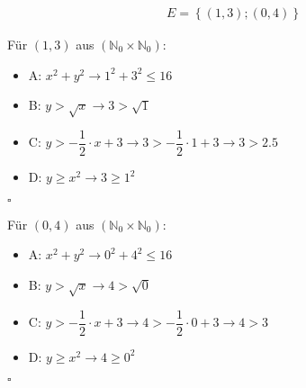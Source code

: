 \begin{eqnarray}
	E= \left\{ (1,3); (0,4) \right\} 
\end{eqnarray}

\clearpage

Für $(1,3)$ aus $\left(\mathbb{N}_0 \times \mathbb{N}_0\right)$:
\begin{itemize}
	\item A: $ x^2 +y^2 \rightarrow 1^2 + 3^2 \le 16$
	\item B: $ y > \sqrt{x} \rightarrow 3 > \sqrt{1}$
	\item C: $y > -\dfrac{1}{2}\cdot x+3 \rightarrow 3 > -\dfrac{1}{2} \cdot 1 +3 \rightarrow 3 > 2.5$
	\item D: $y \ge x^2 \rightarrow 3 \ge 1^2$
\end{itemize}
$\square$

\vspace{2cm}
Für $(0,4)$ aus $\left(\mathbb{N}_0 \times \mathbb{N}_0\right)$:
\begin{itemize}
	\item 
	A: $ x^2 +y^2 \rightarrow 0^2 + 4^2 \le 16$
	\item 
	B: $ y > \sqrt{x} \rightarrow 4 > \sqrt{0}$
	\item 
	C: $y > -\dfrac{1}{2}\cdot x+3 \rightarrow 4 > -\dfrac{1}{2} \cdot 0 +3 \rightarrow 4 > 3$
	\item
	D: $y \ge x^2 \rightarrow 4 \ge 0^2 $ 
\end{itemize}
$\square$